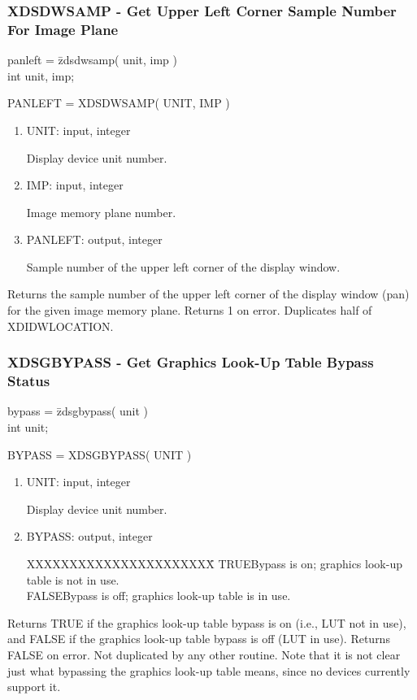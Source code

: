 \subsubsection{XDSDWSAMP - Get Upper Left Corner Sample Number For Image Plane}
\begin{tabbing}
panleft = \=zdsdwsamp( unit, imp )\\
\>int  unit, imp;\\
\end{tabbing}
PANLEFT = XDSDWSAMP( UNIT, IMP )
\begin{enumerate}
\item UNIT:  input, integer

Display device unit number.
\item IMP:  input, integer

Image memory plane number.
\item PANLEFT:  output, integer

Sample number of the upper left corner of the display window.
\end{enumerate}
Returns the sample number of the upper left corner of the display window
(pan) for the given image memory plane.  Returns 1 on error.  Duplicates
half of XDIDWLOCATION.
\newpage
\subsubsection{XDSGBYPASS - Get Graphics Look-Up Table Bypass Status}
\begin{tabbing}
bypass = \=zdsgbypass( unit )\\
\>int  unit;\\
\end{tabbing}
BYPASS = XDSGBYPASS( UNIT )
\begin{enumerate}
\item UNIT:  input, integer

Display device unit number.
\item BYPASS:  output, integer
\begin{tabbing}
XXXXXXXXXXXXXXXXXXXXXX\=\kill
TRUE\>Bypass is on; graphics look-up table is not in use.\\
FALSE\>Bypass is off; graphics look-up table is in use.\\
\end{tabbing}
\end{enumerate}
Returns TRUE if the graphics look-up table bypass is on (i.e.,
LUT not in use), and FALSE if the graphics look-up table bypass is
off (LUT in use).  Returns FALSE on error.  Not duplicated by any 
other routine.  Note that it is not clear just what bypassing the 
graphics look-up table means, since no devices currently support it.
\newpage
